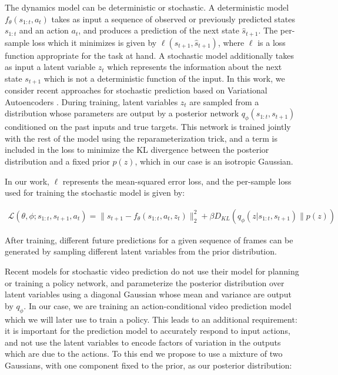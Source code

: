 \documentclass{article} %
\begin{document}
The dynamics model can be deterministic or stochastic.
A deterministic model $f_\theta(s_{1:t}, a_t)$ takes as input a sequence of observed or previously predicted states $s_{1:t}$ and an action $a_t$, and produces a prediction of the next state $\hat{s}_{t+1}$. The per-sample loss which it minimizes is given by $\ell(s_{t+1}, \hat{s}_{t+1})$, where $\ell$ is a loss function appropriate for the task at hand.
A stochastic model additionally takes as input a latent variable $z_t$ which represents the information about the next state $s_{t+1}$ which is not a deterministic function of the input.
In this work, we consider recent approaches for stochastic prediction based on Variational Autoencoders \citep{VAE, Babaeizadeh2018, Denton2018}. 
During training, latent variables $z_t$ are sampled from a distribution whose parameters are output by a posterior network $q_\phi(s_{1:t}, s_{t+1})$ conditioned on the past inputs and true targets. This network is trained jointly with the rest of the model using the reparameterization trick, and a term is included in the loss to minimize the KL divergence between the posterior distribution and a fixed prior $p(z)$, which in our case is an isotropic Gaussian.

In our work, $\ell$ represents the mean-squared error loss, and the per-sample loss used for training the stochastic model is given by:

\begin{align}
  \label{model-loss}
  \mathcal{L}(\theta, \phi ; s_{1:t}, s_{t+1}, a_t) = \|s_{t+1} - f_\theta(s_{1:t}, a_t, z_t) \|_2^2 + \beta D_{KL}(q_\phi(z | s_{1:t}, s_{t+1}) \| p(z))
\end{align}

After training, different future predictions for a given sequence of frames can be generated by sampling different latent variables from the prior distribution.

Recent models for stochastic video prediction \citep{Babaeizadeh2018, Denton2018} do not use their model for planning or training a policy network, and parameterize the posterior distribution over latent variables using a diagonal Gaussian whose mean and variance are output by $q_\phi$. 
In our case, we are training an action-conditional video prediction model which we will later use to train a policy. This leads to an additional requirement: it is important for the prediction model to accurately respond to input actions, and not use the latent variables to encode factors of variation in the outputs which are due to the actions.
To this end we propose to use a mixture of two Gaussians, with one component fixed to the prior, as our posterior distribution:
\end{document}
